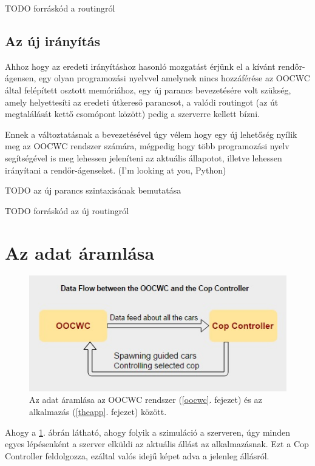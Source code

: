 \documentclass[a4paper,12pt]{report}
\begin{document}
TODO forráskód a routingról

\subsection{Az új irányítás}
\label{newrouting}

Ahhoz hogy az eredeti irányításhoz hasonló mozgatást érjünk el a kívánt rendőr-ágensen, egy olyan programozási nyelvvel amelynek nincs hozzáférése az OOCWC által felépített osztott memóriához, egy új parancs bevezetésére volt szükség, amely helyettesíti az eredeti útkereső parancsot, a valódi routingot (az út megtalálását kettő csomópont között) pedig a szerverre kellett bízni.

\vspace{2mm}
Ennek a változtatásnak a bevezetésével úgy vélem hogy egy új lehetőség nyílik meg az OOCWC rendszer számára, mégpedig hogy több programozási nyelv segítségével is meg lehessen jeleníteni az aktuális állapotot, illetve lehessen irányítani a rendőr-ágenseket. (I'm looking at you, Python)

\vspace{2mm}
TODO az új parancs szintaxisának bemutatása

TODO forráskód az új routingról

\section{Az adat áramlása}
\label{dataflow}

\begin{figure}[h]
\centerline{
\includegraphics[width=4.5in]{img/dataflow}}
\caption{Az adat áramlása az OOCWC rendszer (\ref{oocwc}. fejezet) és az alkalmazás (\ref{theapp}. fejezet) között.}
\label{dataflowpicture}
\end{figure}

Ahogy a \ref{dataflowpicture}. ábrán látható, ahogy folyik a szimuláció a szerveren, úgy minden egyes lépésenként a szerver elküldi az aktuális állást az alkalmazásnak. Ezt a Cop Controller feldolgozza, ezáltal valós idejű képet adva a jelenleg állásról.
\end{document}
